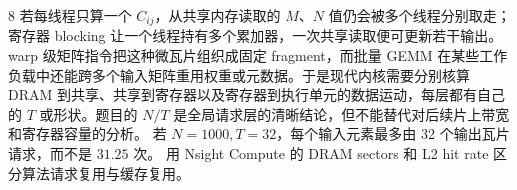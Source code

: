 \begin{solutionexercise}{8}
若每线程只算一个 $C_{ij}$，从共享内存读取的 $M$、$N$ 值仍会被多个线程分别取走；寄存器 blocking 让一个线程持有多个累加器，一次共享读取便可更新若干输出。warp 级矩阵指令把这种微瓦片组织成固定 fragment，而批量 GEMM 在某些工作负载中还能跨多个输入矩阵重用权重或元数据。于是现代内核需要分别核算 DRAM 到共享、共享到寄存器以及寄存器到执行单元的数据运动，每层都有自己的 $T$ 或形状。题目的 $N/T$ 是全局请求层的清晰结论，但不能替代对后续片上带宽和寄存器容量的分析。
\variantheading 若 $N=1000,T=32$，每个输入元素最多由 32 个输出瓦片请求，而不是 $31.25$ 次。
\practiceheading 用 Nsight Compute 的 DRAM sectors 和 L2 hit rate 区分算法请求复用与缓存复用。
\end{solutionexercise}


